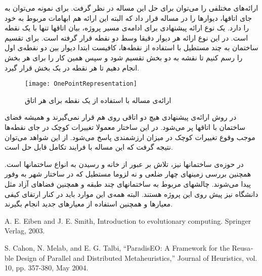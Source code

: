 \documentclass{report}
\begin{document}
ارائه‌های مختلفی را می‌توان برای حل این مساله در نظر گرفت. برای نمونه می‌توان به جای اتاقها، دیوارها را در مساله قرار داد که البته این ارائه هم ابهامات مربوط به خود را دارد. یک نوع ارائه پیشنهادی برای ادامه‌ی مسیر پروژه، بیان اتاقها تنها با یک نقطه است. در این نوع ارائه هر دیوار دقیقا وسط دو نقطه قرار گرفته است. برای تقسیم ساختمان به چند مستطیل با استفاده از نقطه‌ها، کافیست ابتدا دیوار بین دو نقطه‌ی اول را رسم کنیم تا نقشه به دو بخش تقسیم شود و سپس همین کار را برای هر بخش انجام دهیم تا هر نقطه در یک بخش قرار گیرد.

\begin{figure} \centerline{\texttt{[image: OnePointRepresentation]}} \caption{\label{fOnePointRepresentation}
ارائه‌ی مساله با استفاده از یک نقطه برای هر اتاق
} \end{figure}

در روش ارائه‌ی پیشنهادی هیچ دو اتاقی روی هم قرار نمی‌گیرند و همیشه فضای ساختمان با اتاقها پر می‌شود. در این ساختار معمولا تغییرات کوچک در جای نقطه‌ها موجب وقوع تغییرات کوچک در میزان ارزشمندی پاسخ می‌شود. از این شواهد می‌توان نتیجه گرفت که این مساله با فرایند تکامل قابل حل است.

در حوزه‌ی ساختمانها نیز، تلاش بر عبور از خانه و رسیدن به انواع ساختمانها است. همچنین بررسی زمینهای چهار ضلعی و نه لزوما مستطیل که در ساختار شهر به وفور پیدا می‌شوند. چالشهای مربوط به ساختمانهای چند طبقه و همچنین فضاهای آزاد مثل دانشگاه نیز پیش روی این پروژه هستند. البته همه‌ی این موارد باید در کنار ارتقای کیفی معیارها و همچنین استفاده از معیارهای جدید انجام بگیرند.

\renewcommand*{\refname}{\section{منابع}}
\begin{thebibliography}{9}
\begin{latin}

A. E. Eiben and J. E. Smith, Introduction to evolutionary computing. Springer Verlag, 2003.

S. Cahon, N. Melab, and E. G. Talbi, “ParadisEO: A Framework for the Reusable Design of Parallel and Distributed Metaheuristics,” Journal of Heuristics, vol. 10, pp. 357-380, May 2004.

\end{latin}
\end{thebibliography}
\end{document}
